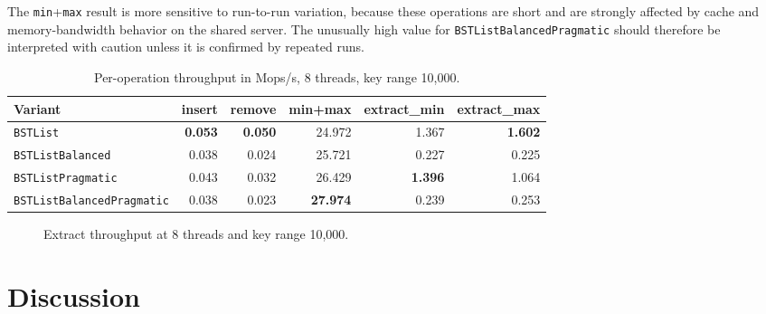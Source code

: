 \documentclass[a4paper,11pt]{article}
\newcommand{\code}[1]{\texttt{#1}}
\begin{document}
The \code{min}+\code{max} result is more sensitive to run-to-run variation, because these operations are short and are strongly affected by cache and memory-bandwidth behavior on the shared server. The unusually high value for \code{BSTListBalancedPragmatic} should therefore be interpreted with caution unless it is confirmed by repeated runs.

\begin{table}[H]
\centering
\caption{Per-operation throughput in Mops/s, 8 threads, key range 10,000.}
\label{tab:per-operation}
\begin{tabular}{l r r r r r}
\toprule
Variant & insert & remove & min+max & extract\_min & extract\_max \\
\midrule
\code{BSTList} & \textbf{0.053} & \textbf{0.050} & 24.972 & 1.367 & \textbf{1.602} \\
\code{BSTListBalanced} & 0.038 & 0.024 & 25.721 & 0.227 & 0.225 \\
\code{BSTListPragmatic} & 0.043 & 0.032 & 26.429 & \textbf{1.396} & 1.064 \\
\code{BSTListBalancedPragmatic} & 0.038 & 0.023 & \textbf{27.974} & 0.239 & 0.253 \\
\bottomrule
\end{tabular}
\end{table}

\begin{figure}[H]
\centering
{}
\caption{Extract throughput at 8 threads and key range 10,000.}
\label{fig:extract-throughput}
\end{figure}

\section{Discussion}
\end{document}
